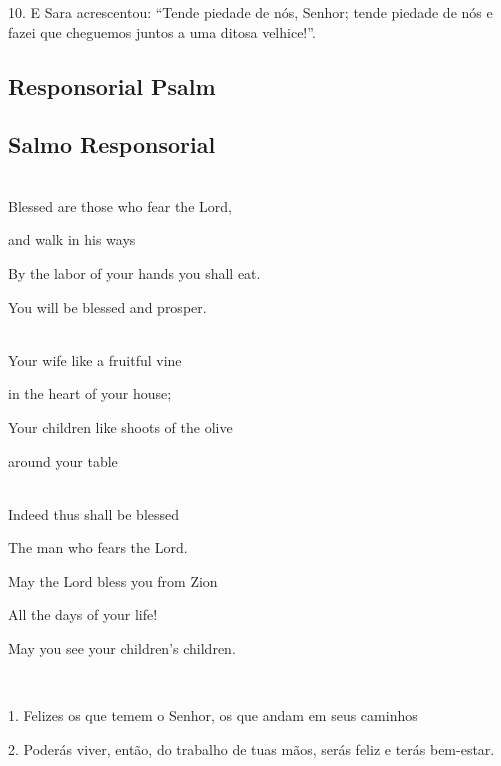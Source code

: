 \documentclass[10pt,a5]{article}
\newcommand \subsect[2] {\subsection*{#1} \switchcolumn \subsection*{#2} \switchcolumn*}
\begin{document}
\begin{paracol}{2}
10.
E Sara acrescentou: “Tende piedade de nós, Senhor; tende piedade de nós e fazei que cheguemos juntos a uma ditosa velhice!”.


 \switchcolumn*

 \subsect{Responsorial Psalm}{Salmo Responsorial}

 \\

 Blessed are those who fear the Lord, 

 \hspace*{2em}and walk in his ways

 By the labor of your hands you shall eat. 

 \hspace*{2em}You will be blessed and prosper.

 \\

 Your wife like a fruitful vine

 \hspace*{2em}in the heart of your house;

 Your children like shoots of the olive

 \hspace*{2em}around your table

 \\

 Indeed thus shall be blessed

 \hspace*{2em}The man who fears the Lord.

 May the Lord bless you from Zion

 \hspace*{2em}All the days of your life!

 \hspace*{2em}May you see your children's children.

 \\


\switchcolumn


1.
Felizes os que temem o Senhor, os que andam em seus caminhos

2.
Poderás viver, então, do trabalho de tuas mãos, serás feliz e terás bem-estar.


\end{paracol}
\end{document}
